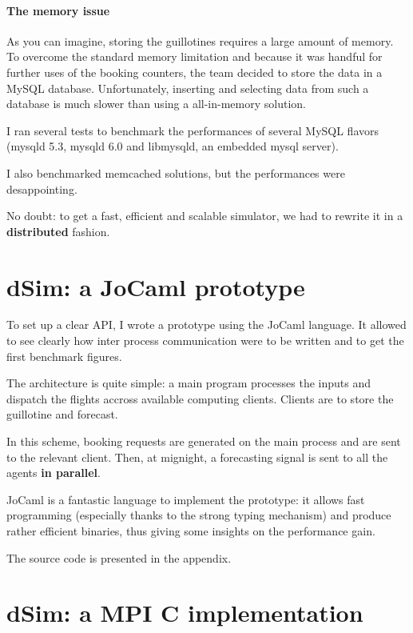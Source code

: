 \documentclass[11pt]{JHEP3}
\begin{document}
\paragraph{The memory issue}

As you can imagine, storing the guillotines requires a large amount of memory. To overcome the standard memory limitation and because it was handful for further uses of the booking counters, the team decided to store the data in a MySQL database. 
Unfortunately, inserting and selecting data from such a database is much slower than using a all-in-memory solution.

I ran several tests to benchmark the performances of several MySQL flavors (mysqld 5.3, mysqld 6.0 and libmysqld, an embedded mysql server).

I also benchmarked memcached solutions, but the performances were desappointing.

No doubt: to get a fast, efficient and scalable simulator, we had to rewrite it in a \textbf{distributed} fashion.

\section{dSim: a JoCaml prototype}

To set up a clear API, I wrote a prototype using the JoCaml language. It allowed to see clearly how inter process communication were to be written and to get the first benchmark figures.

The architecture is quite simple: a main program processes the inputs and dispatch the flights accross available computing clients. Clients are to store the guillotine and forecast.

In this scheme, booking requests are generated on the main process and are sent to the relevant client. Then, at mignight, a forecasting signal is sent to all the agents \textbf{in parallel}.

JoCaml is a fantastic language to implement the prototype: it allows fast programming (especially thanks to the strong typing mechanism) and produce rather efficient binaries, thus giving some insights on the performance gain.

The source code is presented in the appendix.

\section{dSim: a MPI C implementation}
\end{document}
